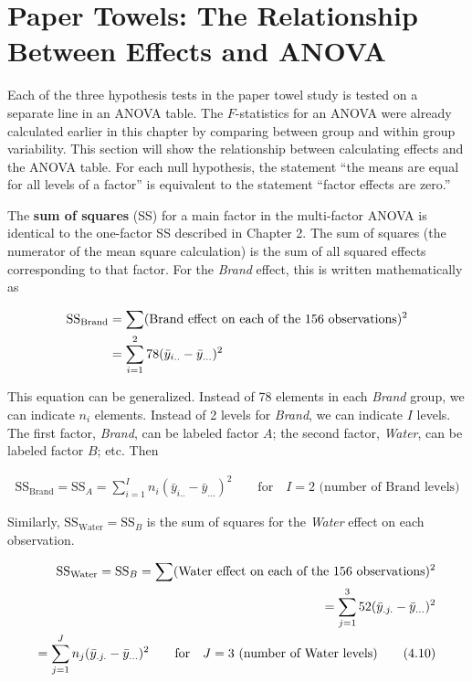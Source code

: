 \documentclass[
]{report}
\begin{document}
\hypertarget{paper-towels-the-relationship-between-effects-and-anova}{%
\section{\texorpdfstring{\textbf{Paper Towels: The Relationship Between Effects and ANOVA}}{Paper Towels: The Relationship Between Effects and ANOVA}}\label{paper-towels-the-relationship-between-effects-and-anova}}

Each of the three hypothesis tests in the paper towel study is tested on a separate line in an ANOVA table. The \(F\)-statistics for an ANOVA were already calculated earlier in this chapter by comparing between group and within group variability. This section will show the relationship between calculating effects and the ANOVA table. For each null hypothesis, the statement ``the means are equal for all levels of a factor'' is equivalent to the statement ``factor effects are zero.''

The \textbf{sum of squares} (SS) for a main factor in the multi-factor ANOVA is identical to the one-factor SS described in Chapter 2. The sum of squares (the numerator of the mean square calculation) is the sum of all squared effects corresponding to that factor. For the \emph{Brand} effect, this is written mathematically as

\begin{align}
\text{SS}_{\text{Brand}} &= \sum (\text{Brand effect on each of the 156 observations})^2 \notag \\
&= \sum_{i=1}^{2} 78(\bar{y}_{i..} - \bar{y}_{...})^2
\notag
\end{align}

This equation can be generalized. Instead of 78 elements in each \emph{Brand} group, we can indicate \(n_i\) elements. Instead of 2 levels for \emph{Brand}, we can indicate \(I\) levels. The first factor, \emph{Brand}, can be labeled factor \(A\); the second factor, \emph{Water}, can be labeled factor \(B\); etc. Then

\begin{align}\label{4.9}
\text{SS}_{\text{Brand}} = \text{SS}_A = \sum_{i=1}^{I} n_i(\bar{y}_{i..} - \bar{y}_{...})^2 \qquad \text{for} \quad I=2 \text{ (number of Brand levels)}
\tag{4.9}
\end{align}

Similarly, \(\text{SS}_{\text{Water}} = \text{SS}_B\) is the sum of squares for the \emph{Water} effect on each observation.

\begin{align}\label{4.10}
\text{SS}_{\text{Water}} = \text{SS}_B = \sum (\text{Water effect on each of the 156 observations})^2 \notag \\
= \sum_{j=1}^{3} 52(\bar{y}_{.j.} - \bar{y}_{...})^2 \notag \\
= \sum_{j=1}^{J} n_j(\bar{y}_{.j.} - \bar{y}_{...})^2 \qquad \text{for} \quad J=3 \text{ (number of Water levels)}
\tag{4.10}
\end{align}
\end{document}
